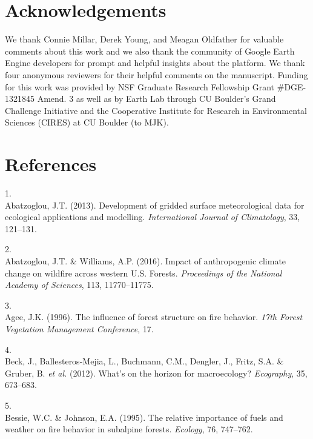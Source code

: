 \documentclass[]{article}
\begin{document}
\hypertarget{acknowledgements}{%
\section{Acknowledgements}\label{acknowledgements}}

We thank Connie Millar, Derek Young, and Meagan Oldfather for valuable
comments about this work and we also thank the community of Google Earth
Engine developers for prompt and helpful insights about the platform. We
thank four anonymous reviewers for their helpful comments on the
manuscript. Funding for this work was provided by NSF Graduate Research
Fellowship Grant \#DGE- 1321845 Amend. 3 as well as by Earth Lab through
CU Boulder's Grand Challenge Initiative and the Cooperative Institute
for Research in Environmental Sciences (CIRES) at CU Boulder (to MJK).

\hypertarget{references}{%
\section*{References}\label{references}}

\hypertarget{refs}{}
\leavevmode\hypertarget{ref-abatzoglou2013}{}%
1.\\
Abatzoglou, J.T. (2013). Development of gridded surface meteorological
data for ecological applications and modelling. \emph{International
Journal of Climatology}, 33, 121--131.

\leavevmode\hypertarget{ref-abatzoglou2016}{}%
2.\\
Abatzoglou, J.T. \& Williams, A.P. (2016). Impact of anthropogenic
climate change on wildfire across western U.S. Forests.
\emph{Proceedings of the National Academy of Sciences}, 113,
11770--11775.

\leavevmode\hypertarget{ref-agee1996}{}%
3.\\
Agee, J.K. (1996). The influence of forest structure on fire behavior.
\emph{17th Forest Vegetation Management Conference}, 17.

\leavevmode\hypertarget{ref-beck2012}{}%
4.\\
Beck, J., Ballesteros-Mejia, L., Buchmann, C.M., Dengler, J., Fritz,
S.A. \& Gruber, B. \emph{et al.} (2012). What's on the horizon for
macroecology? \emph{Ecography}, 35, 673--683.

\leavevmode\hypertarget{ref-bessie1995}{}%
5.\\
Bessie, W.C. \& Johnson, E.A. (1995). The relative importance of fuels
and weather on fire behavior in subalpine forests. \emph{Ecology}, 76,
747--762.
\end{document}

